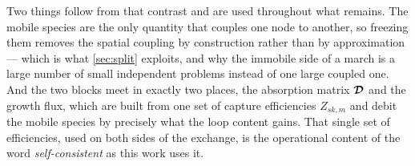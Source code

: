 Two things follow from that contrast and are used throughout what remains. The
mobile species are the only quantity that couples one node to another, so
freezing them removes the spatial coupling by construction rather than by
approximation --- which is what \cref{sec:split} exploits, and why the immobile
side of a march is a large number of small independent problems instead of one
large coupled one. And the two blocks meet in exactly two places, the absorption
matrix $\bm{\mathcal{D}}$ and the growth flux, which are built from one set of capture
efficiencies $Z_{sk,m}$ and debit the mobile species by precisely what the loop
content gains. That single set of efficiencies, used on both sides of the
exchange, is the operational content of the word \emph{self-consistent} as this
work uses it.
